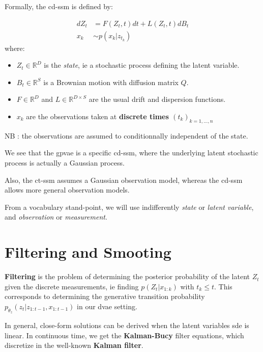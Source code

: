 Formally, the \gls{cd-ssm} is defined by:

\begin{tcolorbox}[colback=blue!5!white,colframe=black!75!black,title=Continuous-Discrete State Space model]
    \begin{align}
        dZ_t &= F(Z_t, t)dt + L(Z_t,t) dB_t \\
        x_k &\sim p(x_k \vert z_{t_k})
    \end{align}
    where:
    \begin{itemize}
        \item $Z_t \in \mathbb{R}^{D}$ is the \textit{state}, ie a stochastic process defining the latent variable.
        \item $B_t \in \mathbb{R}^{S}$ is a Brownian motion with diffusion matrix $Q$.
        \item $F \in \mathbb{R}^{D}$ and $L \in \mathbb{R}^{D \times S}$ are the usual drift and dispersion functions.
        \item $x_k$ are the observations taken at \textbf{discrete times $(t_k)_{k=1,...,n}$}
    \end{itemize}
    NB : the observations are assumed to conditionnally independent of the state.
\end{tcolorbox}

We see that the \gls{gpvae} is a specific \gls{cd-ssm}, where the underlying latent stochastic process 
is actually a Gaussian process.

Also, the \gls{ct-ssm} assumes a Gaussian observation model, whereas the \gls{cd-ssm} allows more general 
observation models.

From a vocabulary stand-point, we will use indifferently \textit{state} or \textit{latent variable}, and 
\textit{observation} or \textit{measurement}.

\section{Filtering and Smooting}

\textbf{Filtering} is the problem of determining the posterior probability of the latent $Z_t$ given the 
discrete measurements, ie finding $p(Z_t \vert x_{1:k})$ with $t_k \leq t$. This corresponds to 
determining the generative transition probability $p_{\theta_z}(z_t \vert z_{1:t-1}, x_{1:t-1})$ in our 
\gls{dvae} setting.

In general, close-form solutions can be derived when the latent variables \gls{sde} is linear. In continuous 
time, we get the \textbf{Kalman-Bucy} filter equations, which discretize in the well-known \textbf{Kalman filter}.

